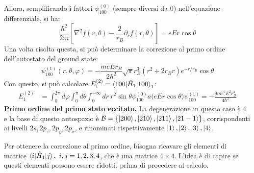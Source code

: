 \documentclass[11pt, a4paper]{scrartcl} %
\numberwithin{equation}{subsection}
\theoremstyle{style2}
\theoremstyle{style1}
\begin{document}
Allora, semplificando i fattori $\psi ^{(0)}_{100}  $ (sempre diversi da $0$) nell'equazione differenziale, si ha:
\begin{equation}
	\frac{\hbar ^2}{2m} \left[ \nabla ^2 f(r,\theta ) - \frac{2}{r_B}\partial _r f(r,\theta ) \right] = eEr\cos \theta 
\end{equation}
Una volta risolta questa, si pu\`o determinare la correzione al primo ordine dell'autostato del ground state:
\begin{equation}
	\psi ^{(1)} _{100} (r,\theta ,\varphi ) =- \frac{me Er_B}{2\hbar ^2}\sqrt{\pi} r_B^3	(r^2 + 2r_Br) e^{ - r / r_B} \cos \theta 
\end{equation}
Con questo, si pu\`o calcolare $E_1^{(2)} = \braket{100|\hat{H}_1|100} _1$:
\begin{equation}
	\begin{split}
		E_1^{(2)} &= \int_{0} ^{2\pi} d\varphi \int_{0} ^\pi d \theta \int_{0} ^{+\infty} dr \ r^2 \sin \theta  \psi _{100} ^{(0)} a\big(eEr\cos\theta \big) \psi _{100} ^{(1)}  = -\frac{9me^2 E^2 r^4_B}{4 \hbar ^2}
	\end{split}
\end{equation}
\vspace{0.5cm}
\newline
{\sffamily\bfseries Primo ordine del primo stato eccitato.}
La degenerazione in questo caso \`e $4$ e la base di questo autospazio \`e $\mathcal{B} = \left\{ \ket{200} , \ket{210} , \ket{211} ,\ket{21-1}  \right\} $, corrispondenti ai livelli $2s,2p_z,2p_y,2p_x$, e rinominati rispettivamente $\ket{1} ,\ket{2} ,\ket{3} ,\ket{4} $.

Per ottenere la correzione al primo ordine, bisogna ricavare gli elementi di matrice $\braket{i|\hat{H}_1|j} , \ i,j = 1,2,3,4 $, che \`e una matrice $4\times 4$. 
L'idea \`e di capire se questi elementi possono essere ridotti, prima di procedere al calcolo.
\end{document}
